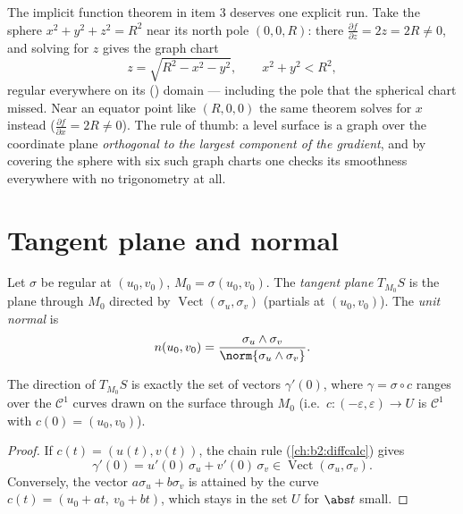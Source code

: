 \begin{example}
\label{ex:b2:surfaces:levelgraph}
The implicit function theorem in item 3 deserves one explicit
run. Take the sphere $x^2 + y^2 + z^2 = R^2$ near its north
pole $(0, 0, R)$: there $\frac{\partial f}{\partial z} = 2z =
2R \neq 0$, and solving for $z$ gives the graph chart
\[
z = \sqrt{R^2 - x^2 - y^2},
\qquad x^2 + y^2 < R^2 ,
\]
regular everywhere on its () domain --- including the
pole that the spherical chart missed. Near an equator point
like $(R, 0, 0)$ the same theorem solves for $x$ instead
($\frac{\partial f}{\partial x} = 2R \neq 0$). The rule of
thumb: a level surface is a graph over the coordinate plane
\emph{orthogonal to the largest component of the gradient},
and by covering the sphere with six such graph charts one
checks its smoothness everywhere with no trigonometry at
all.
\end{example}

\section{Tangent plane and normal}

\begin{definition}\label{def:b2:surfaces:tangent}
Let $\sigma$ be regular at $(u_0, v_0)$, $M_0 = \sigma(u_0, v_0)$.
The \emph{tangent plane} $T_{M_0}S$ is the plane through $M_0$
directed by $\operatorname{Vect}(\sigma_u, \sigma_v)$ (partials at
$(u_0, v_0)$). The \emph{unit normal} is
\[
n(u_0, v_0)
= \frac{\sigma_u \wedge \sigma_v}
       {\norm{\sigma_u \wedge \sigma_v}} .
\]
\end{definition}

\begin{proposition}\label{prop:b2:surfaces:velocity}
The direction of $T_{M_0}S$ is exactly the set of vectors
$\gamma'(0)$, where $\gamma = \sigma \circ c$ ranges over the
$\mathcal{C}^1$ curves drawn on the surface through $M_0$ (i.e.\
$c \colon (-\varepsilon, \varepsilon) \to U$ is $\mathcal{C}^1$
with $c(0) = (u_0, v_0)$).
\end{proposition}

\begin{proof}
If $c(t) = (u(t), v(t))$, the chain rule
(\cref{ch:b2:diffcalc}) gives
\[
\gamma'(0) = u'(0)\,\sigma_u + v'(0)\,\sigma_v
\in \operatorname{Vect}(\sigma_u, \sigma_v).
\]
Conversely, the vector $a\sigma_u + b\sigma_v$ is attained by the
curve $c(t) = (u_0 + at,\ v_0 + bt)$, which stays in the  set
$U$ for $\abs t$ small.
\end{proof}

